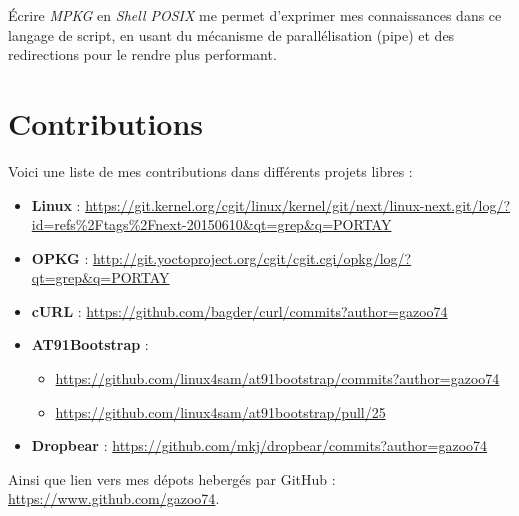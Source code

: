 \documentclass[a4paper]{article}
\begin{document}
Écrire \textit{MPKG} en \textit{Shell POSIX} me permet d'exprimer mes connaissances dans ce langage de script, en usant du mécanisme de parallélisation (pipe) et des redirections pour le rendre plus performant.
\clearpage

\appendix
\section{Contributions}
Voici une liste de mes contributions dans différents projets libres :
\begin{itemize}
\item \textbf{Linux} : \url{https://git.kernel.org/cgit/linux/kernel/git/next/linux-next.git/log/?id=refs\%2Ftags\%2Fnext-20150610&qt=grep&q=PORTAY}
\item \textbf{OPKG} : \url{http://git.yoctoproject.org/cgit/cgit.cgi/opkg/log/?qt=grep&q=PORTAY}
\item \textbf{cURL} : \url{https://github.com/bagder/curl/commits?author=gazoo74}
\item \textbf{AT91Bootstrap} :
\begin{itemize}
\item \url{https://github.com/linux4sam/at91bootstrap/commits?author=gazoo74}
\item \url{https://github.com/linux4sam/at91bootstrap/pull/25}
\end{itemize}
\item \textbf{Dropbear} : \url{https://github.com/mkj/dropbear/commits?author=gazoo74}
\end{itemize}
Ainsi que lien vers mes dépots hebergés par GitHub : \url{https://www.github.com/gazoo74}.
\end{document}
